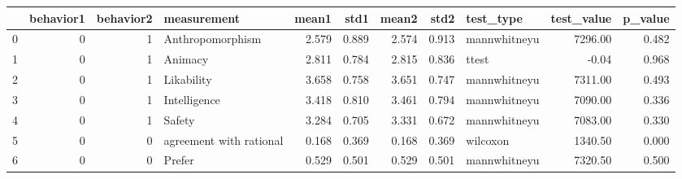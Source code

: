 \begin{tabular}{lrrlrrrrlrr}
\toprule
{} &  behavior1 &  behavior2 &              measurement &  mean1 &   std1 &  mean2 &   std2 &     test\_type &  test\_value &  p\_value \\
\midrule
0 &          0 &          1 &         Anthropomorphism &  2.579 &  0.889 &  2.574 &  0.913 &  mannwhitneyu &     7296.00 &    0.482 \\
1 &          0 &          1 &                  Animacy &  2.811 &  0.784 &  2.815 &  0.836 &         ttest &       -0.04 &    0.968 \\
2 &          0 &          1 &               Likability &  3.658 &  0.758 &  3.651 &  0.747 &  mannwhitneyu &     7311.00 &    0.493 \\
3 &          0 &          1 &             Intelligence &  3.418 &  0.810 &  3.461 &  0.794 &  mannwhitneyu &     7090.00 &    0.336 \\
4 &          0 &          1 &                   Safety &  3.284 &  0.705 &  3.331 &  0.672 &  mannwhitneyu &     7083.00 &    0.330 \\
5 &          0 &          0 &  agreement with rational &  0.168 &  0.369 &  0.168 &  0.369 &      wilcoxon &     1340.50 &    0.000 \\
6 &          0 &          0 &                   Prefer &  0.529 &  0.501 &  0.529 &  0.501 &  mannwhitneyu &     7320.50 &    0.500 \\
\bottomrule
\end{tabular}
